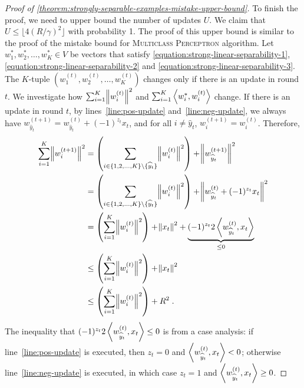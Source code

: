 \begin{proof}[Proof of \autoref{theorem:strongly-separable-examples-mistake-upper-bound}]
To finish the proof, we need to upper bound the number of updates $U$. We claim
that $U \le \lfloor 4(R/\gamma)^2 \rfloor$ with probability 1.
The proof of this upper bound is
similar to the proof of the mistake bound for \textsc{Multiclass Perceptron}
algorithm. Let $w_1^*, w_2^*, \dots, w_K^* \in V$ be vectors that satisfy
\eqref{equation:strong-linear-separability-1},
\eqref{equation:strong-linear-separability-2} and
\eqref{equation:strong-linear-separability-3}.
The $K$-tuple $(w_1^{(t)}, w_2^{(t)}, \dots, w_K^{(t)})$
changes only if there is an update in round $t$.
We investigate how $\sum_{i=1}^K \norm{w_i^{(t)}}^2$ and
$\sum_{i=1}^K \left\langle w_i^*, w_i^{(t)} \right\rangle$ change. If there is an update in round $t$,
by lines~\ref{line:pos-update} and~\ref{line:neg-update}, we always have
$ w_{\widehat y_t}^{(t+1)} = w_{\widehat y_t}^{(t)} + (-1)^{z_t} x_t $,
and for all $i \neq \widehat y_t$, $w_{i}^{(t+1)} = w_{i}^{(t)}$.
Therefore,
\begingroup
\allowdisplaybreaks
\begin{align*}
\sum_{i=1}^K \norm{w_i^{(t+1)}}^2
& = \left( \sum_{i \in \{1,2,\dots,K\} \setminus \{\widehat y_t\}} \norm{w_i^{(t)}}^2 \right) + \norm{w_{\widehat y_t}^{(t+1)}}^2 \\
& = \left( \sum_{i \in \{1,2,\dots,K\} \setminus \{\widehat y_t\}} \norm{w_i^{(t)}}^2 \right) + \norm{w_{\widehat y_t}^{(t)} + (-1)^{z_t} x_t}^2 \\
& = \left( \sum_{i=1}^K \norm{w_i^{(t)}}^2 \right) + \norm{x_t}^2 + \underbrace{(-1)^{z_t} 2 \left\langle w_{\widehat y_t}^{(t)}, x_t \right\rangle}_{\le 0} \\
& \le \left( \sum_{i=1}^K \norm{w_i^{(t)}}^2 \right) + \norm{x_t}^2 \\
& \le \left( \sum_{i=1}^K \norm{w_i^{(t)}}^2 \right) + R^2 \; .
\end{align*}
\endgroup
The inequality that $(-1)^{z_t} 2 \left\langle w_{\widehat y_t}^{(t)}, x_t \right\rangle \leq 0$ is from a case analysis: if line~\ref{line:pos-update} is executed, then $z_t = 0$ and $\left\langle w_{\widehat y_t}^{(t)}, x_t \right\rangle < 0$;
 otherwise line~\ref{line:neg-update} is executed, in which case $z_t = 1$ and $\left\langle w_{\widehat y_t}^{(t)}, x_t \right\rangle \ge 0$.



\end{proof}
